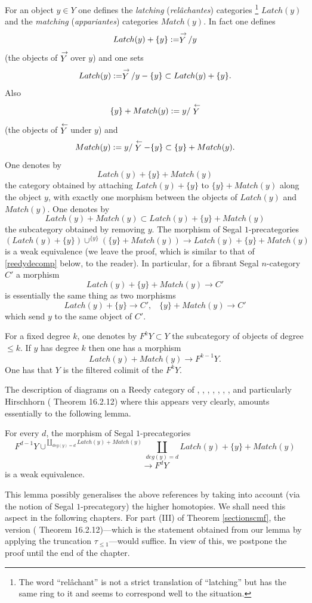 For an object $y\in Y$ one defines the {\em latching} ({\em relâchantes})
categories
\footnote{
The word ``relâchant'' is not a strict translation of
``latching'' but has the same ring to it and seems
to correspond well to the situation.}
$Latch(y)$
and the {\em matching} ({\em appariantes}) categories $Match(y)$.
In fact one defines
$$
Latch(y)+\{ y\} := \stackrel{\rightarrow}{Y}/y
$$
(the objects of $\stackrel{\rightarrow}{Y}$ over $y$)
and one sets
$$
Latch(y):= \stackrel{\rightarrow}{Y}/y -\{ y\} \subset Latch(y)+\{ y\} .
$$
Also
$$
\{ y\} + Match(y):= y/\stackrel{\leftarrow}{Y}
$$
(the objects of $\stackrel{\leftarrow}{Y}$ under $y$)
and
$$
Match(y):= y/\stackrel{\leftarrow}{Y} -\{ y\} \subset \{ y\} + Match(y).
$$
One denotes by
$$
Latch(y)+ \{ y\} + Match(y)
$$
the category obtained by attaching $Latch(y)+\{ y\} $ to
$\{ y\} + Match(y) $ along the object $y$, with exactly one morphism between
the objects of $Latch(y)$ and $Match(y)$. One denotes by
$$
Latch(y)+Match(y)\subset Latch(y)+ \{ y\} + Match(y)
$$
the subcategory obtained by removing $y$.
The morphism of Segal $1$-precategories
$$
(Latch(y)+\{ y\} ) \cup ^{\{ y\} } (\{ y\} + Match(y))\rightarrow
Latch(y)+ \{ y\} + Match(y)
$$
is a weak equivalence (we leave the proof, which is similar to that
of \ref{reedydecomp} below, to the reader). In particular, for a
fibrant Segal $n$-category $C'$ a morphism
$$
Latch(y)+ \{ y\} + Match(y)\rightarrow C'
$$
is essentially the same thing as two morphisms
$$
Latch(y)+\{ y\} \rightarrow C', \;\;\; \{ y\} + Match(y) \rightarrow C'
$$
which send $y$ to the same object of $C'$.

For a fixed degree $k$, one denotes by $F^kY\subset Y$ the subcategory
of objects of degree $\leq k$. If $y$ has degree $k$ then one has a
morphism
$$
Latch(y)+Match(y) \rightarrow F^{k-1}Y.
$$
One has that $Y$ is the filtered colimit of the $F^kY$.

The description of diagrams on a Reedy category of \cite{DHK},
\cite{JardineGoerssBook}, \cite{BousfieldKan},
\cite{DwyerE2}, \cite{BousfieldFriedlander}, \cite{Reedy}, \cite{DwyerKan3},
and particularly Hirschhorn (\cite{Hirschhorn} Theorem 16.2.12) where this
appears very clearly, amounts essentially to the following lemma.

\begin{lemma}
\label{reedydecomp}
For every $d$, the morphism of Segal $1$-precategories
$$
F^{d-1}Y \cup ^{\coprod _{deg(y)=d}Latch(y)+Match(y)}\coprod_{deg(y)=d}
Latch(y)+ \{ y\} + Match(y)
$$
$$
\rightarrow F^dY
$$
is a weak equivalence.
\end{lemma}

This lemma possibly generalises the above references by taking into account
(via the
notion of Segal $1$-precategory) the higher homotopies. We shall need
this aspect in the following chapters. For part
(III) of Theorem \ref{sectionscmf}, the version
(\cite{Hirschhorn} Theorem 16.2.12)---which is the statement obtained from our
lemma by
applying the truncation $\tau_{\leq 1}$---would suffice. In view of this, we
postpone the
proof until the end of the chapter.



